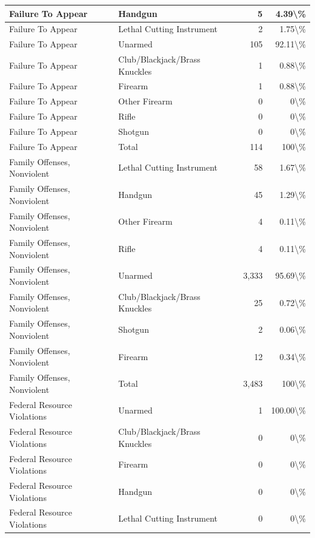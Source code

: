 \documentclass[
]{krantz}
\begin{document}
\begin{longtable}[t]{l|l|r|r}
\hline
Failure To Appear & Handgun & 5 & 4.39\textbackslash{}\%\\
\hline
Failure To Appear & Lethal Cutting Instrument & 2 & 1.75\textbackslash{}\%\\
\hline
Failure To Appear & Unarmed & 105 & 92.11\textbackslash{}\%\\
\hline
Failure To Appear & Club/Blackjack/Brass Knuckles & 1 & 0.88\textbackslash{}\%\\
\hline
Failure To Appear & Firearm & 1 & 0.88\textbackslash{}\%\\
\hline
Failure To Appear & Other Firearm & 0 & 0\textbackslash{}\%\\
\hline
Failure To Appear & Rifle & 0 & 0\textbackslash{}\%\\
\hline
Failure To Appear & Shotgun & 0 & 0\textbackslash{}\%\\
\hline
Failure To Appear & Total & 114 & 100\textbackslash{}\%\\
\hline
Family Offenses, Nonviolent & Lethal Cutting Instrument & 58 & 1.67\textbackslash{}\%\\
\hline
Family Offenses, Nonviolent & Handgun & 45 & 1.29\textbackslash{}\%\\
\hline
Family Offenses, Nonviolent & Other Firearm & 4 & 0.11\textbackslash{}\%\\
\hline
Family Offenses, Nonviolent & Rifle & 4 & 0.11\textbackslash{}\%\\
\hline
Family Offenses, Nonviolent & Unarmed & 3,333 & 95.69\textbackslash{}\%\\
\hline
Family Offenses, Nonviolent & Club/Blackjack/Brass Knuckles & 25 & 0.72\textbackslash{}\%\\
\hline
Family Offenses, Nonviolent & Shotgun & 2 & 0.06\textbackslash{}\%\\
\hline
Family Offenses, Nonviolent & Firearm & 12 & 0.34\textbackslash{}\%\\
\hline
Family Offenses, Nonviolent & Total & 3,483 & 100\textbackslash{}\%\\
\hline
Federal Resource Violations & Unarmed & 1 & 100.00\textbackslash{}\%\\
\hline
Federal Resource Violations & Club/Blackjack/Brass Knuckles & 0 & 0\textbackslash{}\%\\
\hline
Federal Resource Violations & Firearm & 0 & 0\textbackslash{}\%\\
\hline
Federal Resource Violations & Handgun & 0 & 0\textbackslash{}\%\\
\hline
Federal Resource Violations & Lethal Cutting Instrument & 0 & 0\textbackslash{}\%\\

\end{longtable}
\end{document}
